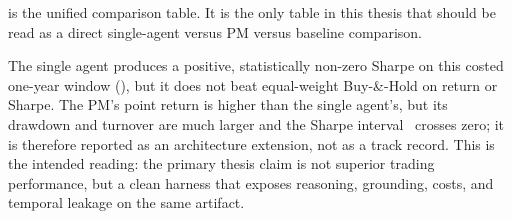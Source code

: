  is the unified comparison table. It is the only table in this thesis
that should be read as a direct single-agent versus PM versus baseline comparison.

\begin{table}[t]
  \centering
  \caption[One-year common-reference comparison]{\commonRunLabel\ over \commonStart\ to
  \commonEnd\ on \commonUniverse. All rows use the same decision window, the same tickers, and
  symmetric $10$\,bps one-way costs. PM performance is reported but not headlined because its
  Sharpe confidence interval crosses zero.}
  \label{tab:commonfinancial}
  \scriptsize
\end{table}

The single agent produces a positive, statistically non-zero Sharpe on this costed one-year
window (\commonSingleSharpeCI), but it does not beat equal-weight Buy-\&-Hold on return or
Sharpe. The PM's point return is higher than the single agent's, but its drawdown and turnover
are much larger and the Sharpe interval \commonPmSharpeCI\ crosses zero; it is therefore
reported as an architecture extension, not as a track record. This is the intended reading:
the primary thesis claim is not superior trading performance, but a clean harness that exposes
reasoning, grounding, costs, and temporal leakage on the same artifact.

